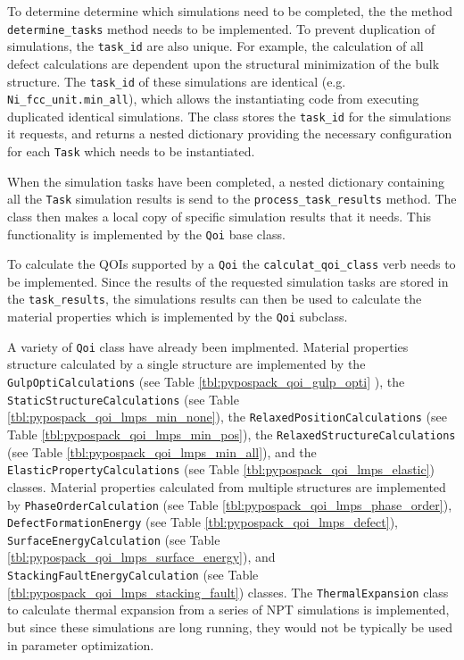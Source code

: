 To determine determine which simulations need to be completed, the the method \verb|determine_tasks| method needs to be implemented.  To prevent duplication of simulations, the \verb|task_id| are also unique.  For example, the calculation of all defect calculations are dependent upon the structural minimization of the bulk structure.  The \verb|task_id| of these simulations are identical (e.g. \verb|Ni_fcc_unit.min_all|), which allows the instantiating code from executing duplicated identical simulations.  The class stores the \verb|task_id| for the simulations it requests, and returns a nested dictionary providing the necessary configuration for each \verb|Task| which needs to be instantiated.

When the simulation tasks have been completed, a nested dictionary containing all the \verb|Task| simulation results is send to the \verb|process_task_results| method.  The class then makes a local copy of specific simulation results that it needs.  This functionality is implemented by the \verb|Qoi| base class.

To calculate the QOIs supported by a \verb|Qoi| the \verb|calculat_qoi_class| verb needs to be implemented.  Since the results of the requested simulation tasks are stored in the \verb|task_results|, the simulations results can then be used to calculate the material properties which is implemented by the \verb|Qoi| subclass.

A variety of \verb|Qoi| class have already been implmented.  Material properties structure calculated by a single structure are implemented by
the \verb|GulpOptiCalculations|
    (see Table \ref{tbl:pypospack_qoi_gulp_opti} ),
the \verb|StaticStructureCalculations|
    (see Table \ref{tbl:pypospack_qoi_lmps_min_none}),
the \verb|RelaxedPositionCalculations|
    (see Table \ref{tbl:pypospack_qoi_lmps_min_pos}),
the \verb|RelaxedStructureCalculations|
    (see Table \ref{tbl:pypospack_qoi_lmps_min_all}),
and the \verb|ElasticPropertyCalculations|
    (see Table \ref{tbl:pypospack_qoi_lmps_elastic})
		classes.
Material properties calculated from multiple structures are implemented by
\verb|PhaseOrderCalculation|
    (see Table \ref{tbl:pypospack_qoi_lmps_phase_order}),
\verb|DefectFormationEnergy|
    (see Table \ref{tbl:pypospack_qoi_lmps_defect}),
\verb|SurfaceEnergyCalculation|
    (see Table \ref{tbl:pypospack_qoi_lmps_surface_energy}), and
\verb|StackingFaultEnergyCalculation|
    (see Table
		    \ref{tbl:pypospack_qoi_lmps_stacking_fault}) classes.
The \verb|ThermalExpansion| class to calculate thermal expansion from a series of NPT simulations is implemented, but since these simulations are long running, they would not be typically be used in parameter optimization.


